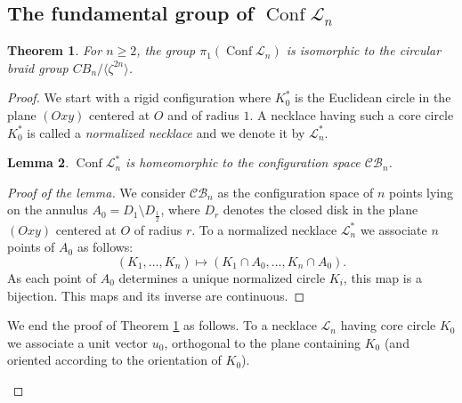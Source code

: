 \documentclass[11pt]{amsart}
\newtheorem{theorem}{Theorem}
\newtheorem{lemma}[theorem]{Lemma}
\begin{document}
\subsection{The fundamental group of ${\mathop{\mathrm{Conf}}\nolimits} \mathcal{L}_n$}
\label{ssec:pi1}

\begin{theorem}
\label{th:circular}
For $n{\geqslant} 2$, the group  $\pi_1({\mathop{\mathrm{Conf}}\nolimits} \mathcal{L}_n)$ is isomorphic 
to the circular braid group $CB_n/\langle \zeta^{2n} \rangle$.  
\end{theorem}

\begin{proof}
We start with a rigid configuration  where
$K_0^*$ is the Euclidean circle in the plane $(Oxy)$ centered at $O$
and of radius $1$. A necklace having such a core circle $K_0^*$
is called a {\emph{{normalized necklace}}} and we denote it by $\mathcal{L}_n^*$. 
  
\begin{lemma}
\label{lem:cbn}
${\mathop{\mathrm{Conf}}\nolimits} \mathcal{L}_n^*$ is homeomorphic to the configuration space $\mathcal{CB}_n$.  
\end{lemma}

\begin{proof}[Proof of the lemma]
We consider  $\mathcal{CB}_n$ as the configuration space of $n$
points lying on the annulus $A_0 = D_1 \setminus D_{\frac12}$, 
where $D_r$ denotes the closed disk in the plane $(Oxy)$ centered at $O$ of radius $r$.
To a normalized necklace $\mathcal{L}_n^*$ we associate $n$ points of $A_0$ as follows:
$$(K_1,\ldots,K_n) \longmapsto (K_1 \cap A_0, \ldots,K_n \cap A_0 ).$$
As each point of $A_0$ determines a unique normalized circle $K_i$,
this map is a bijection. This maps and its inverse are continuous.
\end{proof}  
  

We end the proof of Theorem \ref{th:circular} as follows.
To a necklace $\mathcal{L}_n$ having core circle $K_0$
we associate a unit vector $u_0$, orthogonal to the plane containing
$K_0$ (and oriented according to the orientation of $K_0$).

\begin{figure}
 
\end{figure}
\end{proof}
\end{document}
